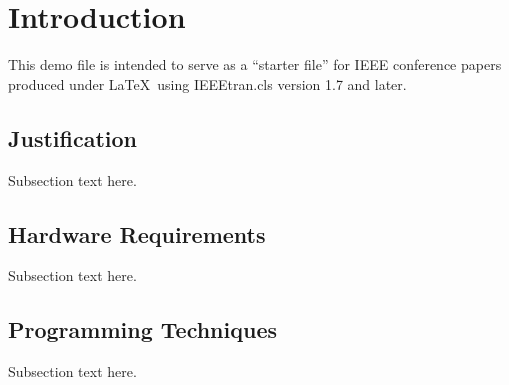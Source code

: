 \section{Introduction}
This demo file is intended to serve as a ``starter file''
for IEEE conference papers produced under \LaTeX\ using
IEEEtran.cls version 1.7 and later.


\subsection{Justification}
Subsection text here.

\subsection{Hardware Requirements}
Subsection text here.

\subsection{Programming Techniques}
Subsection text here.
